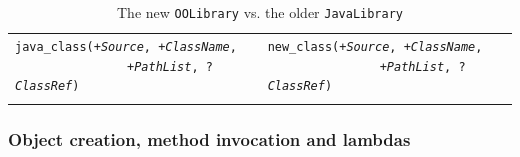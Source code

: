 \begin{table}
\begin{center}
{\begin{tabular}{p{6.5cm}p{7cm}}
    \texttt{java\_class(+\textit{Source}, +\textit{ClassName},}\newline
    \mbox{~~~~~~~~~~~~~~~~}\texttt{+\textit{PathList}, ?\textit{ClassRef})}\newline
    &
    \texttt{new\_class(+\textit{Source}, +\textit{ClassName},}\newline
    \mbox{~~~~~~~~~~~~~~~~}\texttt{+\textit{PathList}, ?\textit{ClassRef})}\newline
    \\
    \\
    \hline\hline
    \end{tabular}
    }\end{center}
    \label{tab:comparison-of-javalibrary-vs-oolibrary-predicates}
    \caption{The new \texttt{OOLibrary} vs. the older \texttt{JavaLibrary}}
\end{table}

\subsubsection{Object creation, method invocation and lambdas}

